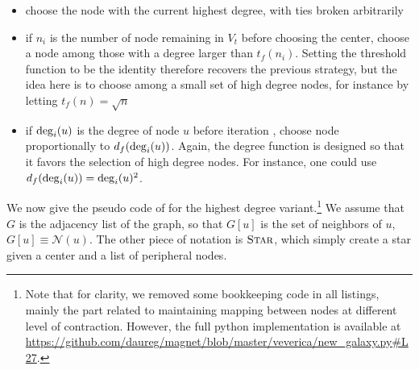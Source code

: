 \begin{itemize}%
  \item choose the node with the current highest degree, with ties broken arbitrarily
  \item if $n_i$ is the number of node remaining in $V_t$ before choosing the \ith{} center, choose
    a node \uar{} among those with a degree larger than $t_f(n_i)$. Setting the threshold function
    to be the identity therefore recovers the previous strategy, but the idea here is to choose
    among a small set of high degree nodes, for instance by letting $t_f(n) = \sqrt{n}$
  \item if $\operatorname{deg}_i(u)$ is the degree of node $u$ before iteration \ith{}, choose node
    proportionally to $d_f(\operatorname{deg}_i(u))$.  Again, the degree function is designed so that it favors the
    selection of high degree nodes. For instance, one could use $d_f(\operatorname{deg}_i(u)) = \operatorname{deg}_i(u)^2$.
\end{itemize}

We now give the pseudo code of \extractStar{} for the highest degree variant.\footnote{Note that for
clarity, we removed some bookkeeping code in all listings, mainly the part related to maintaining
mapping between nodes at different level of contraction. However, the full python implementation
is available at \url{https://github.com/daureg/magnet/blob/master/veverica/new_galaxy.py\#L27}.}
We assume that $G$ is the adjacency list of the graph, so that $G[u]$ is the set of neighbors of
$u$, \ie{} $G[u] \equiv \mathcal{N}(u)$. The other piece of notation is $\textsc{Star}$, which
simply create a star given a center and a list of peripheral nodes.  \vspace{-\baselineskip}

